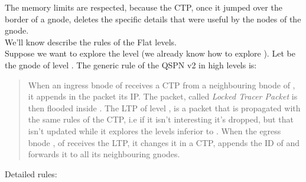 \documentclass[a4paper]{article}
\begin{document}
The memory limits are respected, because the CTP, once it jumped
over the border of a gnode, deletes the specific details that were useful by the nodes of
the gnode.\\
\newline
We'll know describe the rules of the Flat levels.\\
Suppose we want to explore the level  (we already know how to
explore ). Let  be the gnode of level . The generic
rule of the QSPN v2 in high levels is: 
\begin{quote}
When an ingress bnode  of  receives a CTP from a neighbouring bnode of
, it appends in the packet its IP. The packet, called
\emph{Locked Tracer Packet} is then flooded inside .
The LTP of level , is a packet that is propagated with the same rules of
the CTP, i.e if it isn't interesting it's dropped, but that isn't updated
while it explores the levels inferior to . When the egress bnode ,
of  receives the LTP, it changes it in a CTP, appends the ID of  and
forwards it to all its neighbouring gnodes.
\end{quote}
Detailed rules:
\end{document}
